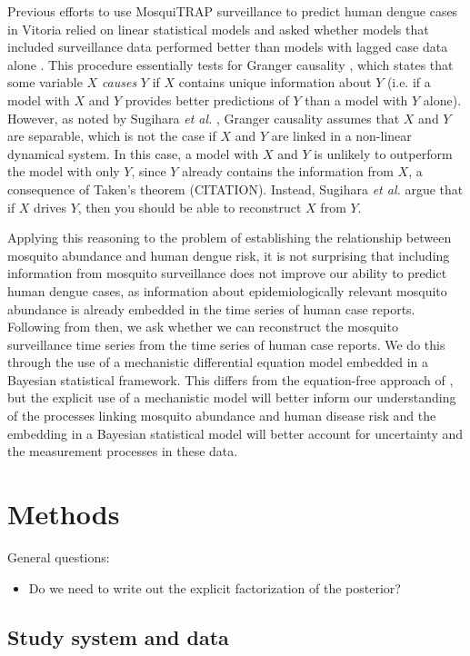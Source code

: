 \documentclass[10pt,letterpaper]{article}
\begin{document}
Previous efforts to use MosquiTRAP surveillance to predict human dengue cases in Vitoria relied on linear statistical models and asked whether models that included surveillance data performed better than models with lagged case data alone \cite{Pepin2015}.
This procedure essentially tests for Granger causality \cite{Granger1969}, which states that some variable $X$ \emph{causes} $Y$ if $X$ contains unique information about $Y$ (i.e. if a model with $X$ and $Y$ provides better predictions of $Y$ than a model with $Y$ alone).
However, as noted by Sugihara \emph{et al.} \cite{Sugihara2012a}, Granger causality assumes that $X$ and $Y$ are separable, which is not the case if $X$ and $Y$ are linked in a non-linear dynamical system.
In this case, a model with $X$ and $Y$ is unlikely to outperform the model with only $Y$, since $Y$ already contains the information from $X$, a consequence of Taken's theorem (CITATION). 
Instead, Sugihara \emph{et al.} argue that if $X$ drives $Y$, then you should be able to reconstruct $X$ from $Y$.

Applying this reasoning to the problem of establishing the relationship between mosquito abundance and human dengue risk, it is not surprising that including information from mosquito surveillance does not improve our ability to predict human dengue cases, as information about epidemiologically relevant mosquito abundance is already embedded in the time series of human case reports.
Following from \cite{Sugihara2012a} then, we ask whether we can reconstruct the mosquito surveillance time series from the time series of human case reports. 
We do this through the use of a mechanistic differential equation model embedded in a Bayesian statistical framework.
This differs from the equation-free approach of \cite{Sugihara2012a}, but the explicit use of a mechanistic model will better inform our understanding of the processes linking mosquito abundance and human disease risk and the embedding in a Bayesian statistical model will better account for uncertainty and the measurement processes in these data.

\section*{Methods}

General questions:
\begin{itemize}
\item Do we need to write out the explicit factorization of the posterior?
\end{itemize}
\subsection*{Study system and data}
\end{document}
